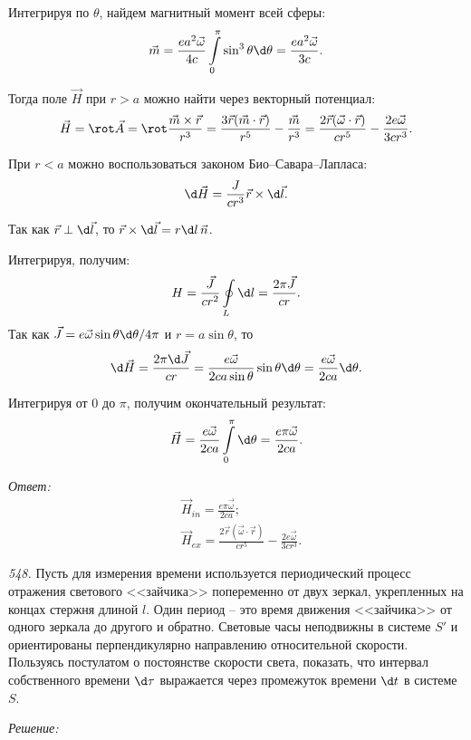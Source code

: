 Интегрируя по \( \theta \), найдем магнитный момент всей сферы:
\[
    \vec{m} =  \frac{ea^2\vec{\omega}}{4c}\int\limits_0^\pi \sin^3\theta\d\theta
    = \frac{ea^2\vec{\omega}}{3c}.
\]

Тогда поле \( \vec{H} \) при \( r > a \) можно найти через векторный потенциал:
\[
    \vec{H} = \rot\vec{A} = \rot\frac{\vec{m}\times\vec{r}}{r^3} =
    \frac{3\vec{r}(\vec{m}\cdot\vec{r})}{r^5} - \frac{\vec{m}}{r^3} =
    \frac{2\vec{r}(\vec{\omega}\cdot\vec{r})}{cr^5} - \frac{2e\vec{\omega}}{3cr^3}.
\]

При \( r < a \) можно воспользоваться законом Био--Савара--Лапласа:
\[
    \d\vec{H} = \frac{J}{cr^3}\vec{r}\times\d\vec{l}.
\]

Так как \( \vec{r} \perp \d\vec{l} \), то \( \vec{r}\times\d\vec{l} = r\d l\,\vec{n} \).

Интегрируя, получим:
\[
    H = \frac{\vec{J}}{cr^2}\oint\limits_L \d l = \frac{2\pi\vec{J}}{cr}.
\]
Так как \( \vec{J} = e\vec{\omega}\sin\theta\d\theta/4\pi \) и \( r = a\sin\theta \), то
\[
    \d\vec{H} = \frac{2\pi\d\vec{J}}{cr} = \frac{e\vec{\omega}}{2ca\sin\theta}
    \sin\theta\d\theta = \frac{e\vec{\omega}}{2ca}\d\theta.
\]

Интегрируя от \( 0 \) до \( \pi \), получим окончательный результат:
\[
    \vec{H} = \frac{e\vec{\omega}}{2ca}\int\limits_0^\pi \d\theta =
    \frac{e\pi\vec{\omega}}{2ca}.
\]

\vspace*{2em}
\emph{Ответ:}
\begin{align*}
    & \vec{H}_{in} = \frac{e\pi\vec{\omega}}{2ca}; \\
    & \vec{H}_{ex} = \frac{2\vec{r}(\vec{\omega}\cdot\vec{r})}{cr^5} -
    \frac{2e\vec{\omega}}{3cr^3}.
\end{align*}

\newpage
\emph{548.} Пусть для измерения времени используется периодический процесс
отражения светового <<зайчика>> попеременно от двух зеркал, укрепленных на
концах стержня длиной \( l \). Один период -- это время движения <<зайчика>> от
одного зеркала до другого и обратно. Световые часы неподвижны в системе \( S' \)
и ориентированы перпендикулярно направлению относительной скорости.
Пользуясь постулатом о постоянстве скорости света, показать, что интервал
собственного времени \( \d\tau \) выражается через промежуток времени \( \d t \)
в системе \( S \).

\vspace*{2em}
\emph{Решение:}
    
